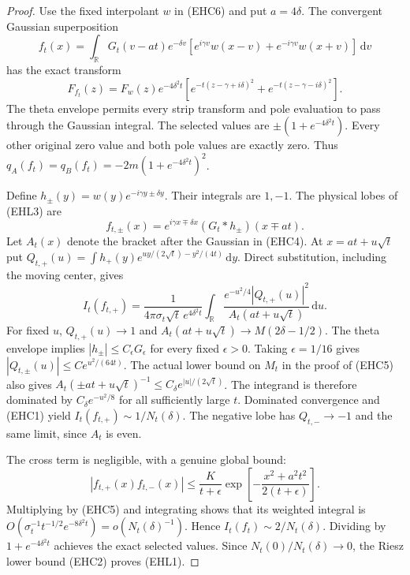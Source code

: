 \documentclass[11pt]{article}
\theoremstyle{remark}\newtheorem{remark}[theorem]{Remark}
\newcommand{\R}{\mathbb R}
\newcommand{\dd}{\,\mathrm d}
\begin{document}
\begin{proof}
Use the fixed interpolant $w$ in (EHC6) and put
$a=4\delta$. The convergent Gaussian superposition
\[
 f_t(x)=\int_\R G_t(v-at)e^{-\delta v}
       [e^{i\gamma v}w(x-v)+e^{-i\gamma v}w(x+v)]\dd v
                                                        \tag{EHL3}
\]
has the exact transform
\[
 F_{f_t}(z)=F_w(z)e^{-4\delta^2t}
       [e^{-t(z-\gamma+i\delta)^2}
                        +e^{-t(z-\gamma-i\delta)^2}].
                                                        \tag{EHL4}
\]
The theta envelope permits every strip transform and pole
evaluation to pass through the Gaussian integral.
The selected values are $\pm(1+e^{-4\delta^2t})$.
Every other original zero value and both pole values are
exactly zero. Thus
$q_A(f_t)=q_B(f_t)=-2m(1+e^{-4\delta^2t})^2$.

Define $h_\pm(y)=w(y)e^{-i\gamma y\pm\delta y}$.
Their integrals are $1,-1$. The physical lobes of (EHL3) are
\[
 f_{t,\pm}(x)=e^{i\gamma x\mp\delta x}
                         (G_t*h_\pm)(x\mp at).
\]
Let $A_t(x)$ denote the bracket after the Gaussian in (EHC4).
At $x=at+u\sqrt t$ put
$Q_{t,+}(u)=\int h_+(y)e^{uy/(2\sqrt t)-y^2/(4t)}\dd y$.
Direct substitution, including the moving center, gives
\[
 I_t(f_{t,+})=
 \frac1{4\pi\sigma_t\sqrt t\,e^{4\delta^2t}}
 \int_\R\frac{e^{-u^2/4}|Q_{t,+}(u)|^2}
                          {A_t(at+u\sqrt t)}\dd u .       \tag{EHL5}
\]
For fixed $u$, $Q_{t,+}(u)\to1$ and
$A_t(at+u\sqrt t)\to M(2\delta-1/2)$.
The theta envelope implies $|h_\pm|\le C_\epsilon G_\epsilon$
for every fixed $\epsilon>0$. Taking $\epsilon=1/16$ gives
$|Q_{t,\pm}(u)|\le C e^{u^2/(64t)}$.
The actual lower bound on $M_t$ in the proof of (EHC5)
also gives
$A_t(\pm at+u\sqrt t)^{-1}\le C_\delta e^{|u|/(2\sqrt t)}$.
The integrand is therefore dominated by
$C_\delta e^{-u^2/8}$ for all sufficiently large $t$.
Dominated convergence and (EHC1) yield
$I_t(f_{t,+})\sim1/N_t(\delta)$.
The negative lobe has $Q_{t,-}\to-1$ and the same limit,
since $A_t$ is even.

The cross term is negligible, with a genuine global bound:
\[
 |f_{t,+}(x)f_{t,-}(x)|
 \le\frac K{t+\epsilon}
      \exp\!\left[-\frac{x^2+a^2t^2}{2(t+\epsilon)}\right].
\]
Multiplying by (EHC5) and integrating shows
that its weighted integral is
$O(\sigma_t^{-1}t^{-1/2}e^{-8\delta^2t})
 =o(N_t(\delta)^{-1})$.
Hence $I_t(f_t)\sim2/N_t(\delta)$.
Dividing by $1+e^{-4\delta^2t}$ achieves the exact selected
values. Since $N_t(0)/N_t(\delta)\to0$, the Riesz lower
bound (EHC2) proves (EHL1).


\end{proof}
\end{document}
